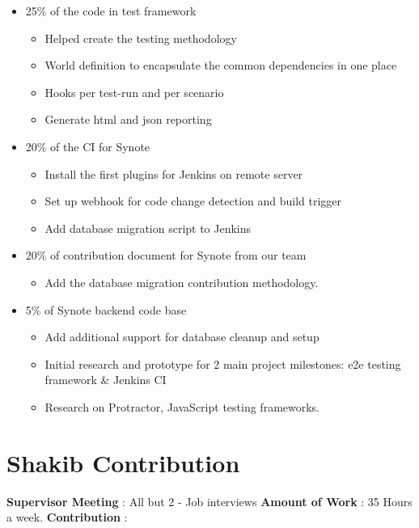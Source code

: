 \begin{itemize}
	\item 25\% of the code in test framework
		\begin{itemize}
			\item Helped create the testing methodology
			\item World definition to encapsulate the common dependencies in one place
			\item Hooks per test-run and per scenario 
			\item Generate html and json reporting
		\end{itemize}
	\item 20\% of the CI for Synote
		\begin{itemize}
			\item Install the first plugins for Jenkins on remote server
			\item Set up webhook for code change detection and build trigger
			\item Add database migration script to Jenkins
		\end{itemize}		 
	\item 20\% of contribution document for Synote from our team
		\begin{itemize}
			\item Add the database migration contribution methodology.
		\end{itemize}
	\item 5\% of Synote backend code base
		\begin{itemize}
			\item Add additional support for database cleanup and setup
			\item Initial research and prototype for 2 main project milestones: e2e testing framework \& Jenkins CI
			\item Research on Protractor, JavaScript testing frameworks.
		\end{itemize}
\end{itemize}

\section{Shakib Contribution}
\label{sec:shakib-contribution}

\textbf{Supervisor Meeting} : All but 2 - Job interviews
\newline
\textbf{Amount of Work} : 35 Hours a week.
\newline
\textbf{Contribution} :

